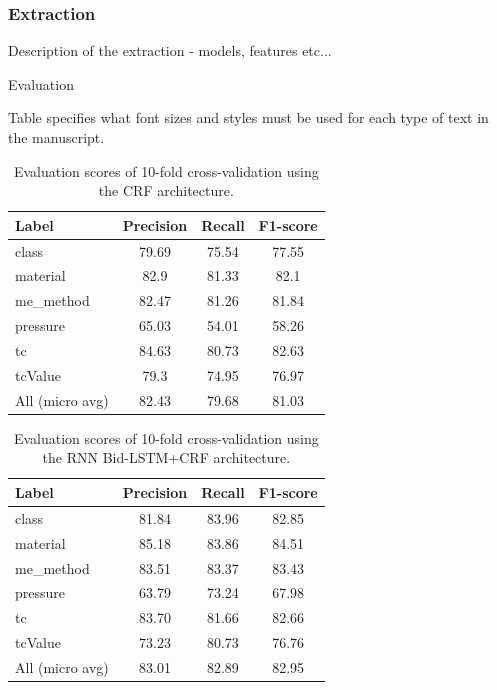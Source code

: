 \documentclass{article}
\begin{document}
\subsubsection{Extraction}

Description of the extraction 
 - models, features etc...
 
Evaluation

Table specifies what font sizes and styles must be used for each type of text in the manuscript.

\begin{table}[ht]
\centering
\begin{tabular}{lccc}
\hline \textbf{Label} & \textbf{Precision} & \textbf{Recall} & \textbf{F1-score} \\ \hline
class           & 79.69 & 75.54 & 77.55 \\
material        & 82.9  & 81.33 & 82.1  \\
me\_method       & 82.47 & 81.26 & 81.84 \\
pressure        & 65.03 & 54.01 & 58.26 \\
tc              & 84.63 & 80.73 & 82.63 \\
tcValue         & 79.3  & 74.95 & 76.97 \\
\hline
All (micro avg) & 82.43 & 79.68 & 81.03 \\
\hline
\end{tabular}
\caption{Evaluation scores of 10-fold cross-validation using the CRF architecture. }
\end{table}


\begin{table}[ht]
\centering
\begin{tabular}{lccc}
\hline \textbf{Label} & \textbf{Precision} & \textbf{Recall} & \textbf{F1-score} \\ \hline
class           & 81.84 & 83.96 & 82.85 \\
material        & 85.18 & 83.86 & 84.51 \\
me\_method      & 83.51 & 83.37 & 83.43 \\
pressure        & 63.79 & 73.24 & 67.98 \\
tc              & 83.70 & 81.66 & 82.66 \\
tcValue         & 73.23 & 80.73 & 76.76 \\
\hline
All (micro avg) & 83.01 & 82.89 & 82.95 \\
\hline
\end{tabular}
\caption{ Evaluation scores of 10-fold cross-validation using the RNN Bid-LSTM+CRF architecture. }
\end{table}
\end{document}
